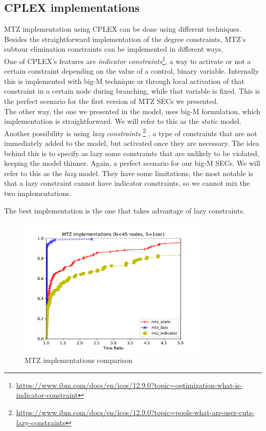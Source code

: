 \subsection{CPLEX implementations}
MTZ implementation using CPLEX can be done using different techniques. Besides
the straightforward implementation of the degree constraints, MTZ's subtour
elimination constraints can be implemented in different ways. \\ One of CPLEX's
features are \emph{indicator
constraints}\footnote{\href{https://www.ibm.com/docs/en/icos/12.9.0?topic=optimization-what-is-indicator-constraint}{https://www.ibm.com/docs/en/icos/12.9.0?topic=optimization-what-is-indicator-constraint}},
a way to activate or not a certain constraint depending on the value of a
control, binary variable. Internally this is implemented with big-M technique or
through local activation of that constraint in a certain node during
branching, while that variable is fixed. This is the perfect scenario for the
first version of MTZ SECs we presented. \\ 
The other way, the one we presented in the model, uses big-M formulation, which
implementation is straightforward. We will refer to this as the \emph{static}
model. \\
Another possibility is using \emph{lazy constraints}
\footnote{\href{https://www.ibm.com/docs/en/icos/12.9.0?topic=pools-what-are-user-cuts-lazy-constraints}{https://www.ibm.com/docs/en/icos/12.9.0?topic=pools-what-are-user-cuts-lazy-constraints}}
, a type of constraints that are not immediately added to the model, but
activated once they are necessary. The idea behind this is to specify as lazy
some constraints that are unlikely to be violated, keeping the model thinner.
Again, a perfect scenario for our big-M SECs. We will refer to this as the
\emph{lazy} model. They have some limitations, the most notable is that a lazy
constraint cannot have indicator constraints, so we cannot mix the two
implementations. 

\begin{claim}
    The best implementation is the one that takes advantage of lazy constraints.
\end{claim}

\begin{figure}
    \centering
    \includegraphics[width=0.8\textwidth]{figures/mtz_comp1.pdf}
    \caption{MTZ implementations comparison}
\end{figure}

